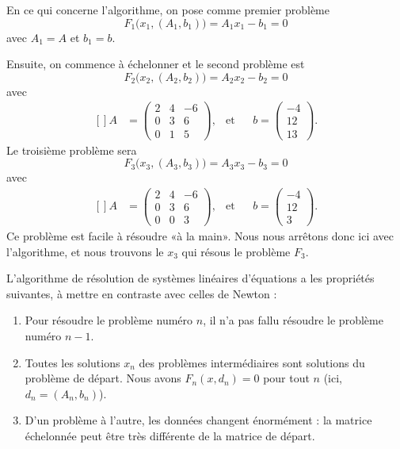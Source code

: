 En ce qui concerne l'algorithme, on pose comme premier problème
\begin{equation}
	F_1\big(x_1,(A_1,b_1)\big)=A_1x_1-b_1=0
\end{equation}
avec $A_1=A$ et $b_1=b$.

Ensuite, on commence à échelonner et le second problème est
\begin{equation}
	F_2\big(x_2,(A_2,b_2)\big)=A_2x_2-b_2=0
\end{equation}
avec 
\begin{equation}
	\begin{aligned}[]
		A&=\begin{pmatrix}
			2	&	4	&	-6	\\
			0	&	3	&	6	\\
			0	&	1	&	5
		\end{pmatrix}, &\text{et}&&b=\begin{pmatrix}
			-4	\\ 
			12	\\ 
			13	
		\end{pmatrix}.
	\end{aligned}
\end{equation}
Le troisième problème sera
\begin{equation}
	F_3\big(x_3,(A_3,b_3)\big)=A_3x_3-b_3=0
\end{equation}
avec 
\begin{equation}
	\begin{aligned}[]
		A&=\begin{pmatrix}
			2	&	4	&	-6	\\
			0	&	3	&	6	\\
			0	&	0	&	3
		\end{pmatrix}, &\text{et}&&b=\begin{pmatrix}
			-4	\\ 
			12	\\ 
			3	
		\end{pmatrix}.
	\end{aligned}
\end{equation}
Ce problème est facile à résoudre «à la main». Nous nous arrêtons donc ici avec l'algorithme, et nous trouvons le $x_3$ qui résous le problème $F_3$.

L'algorithme de résolution de systèmes linéaires d'équations a les propriétés suivantes, à mettre en contraste avec celles de Newton :
\begin{enumerate}

	\item
		Pour résoudre le problème numéro $n$, il n'a pas fallu résoudre le problème numéro $n-1$.
	\item
		Toutes les solutions $x_n$ des problèmes intermédiaires sont solutions du problème de départ. Nous avons $F_n(x,d_n)=0$ pour tout $n$ (ici, $d_n=(A_n,b_n)$).
	\item
		D'un problème à l'autre, les données changent énormément : la matrice échelonnée peut être très différente de la matrice de départ.

\end{enumerate}


